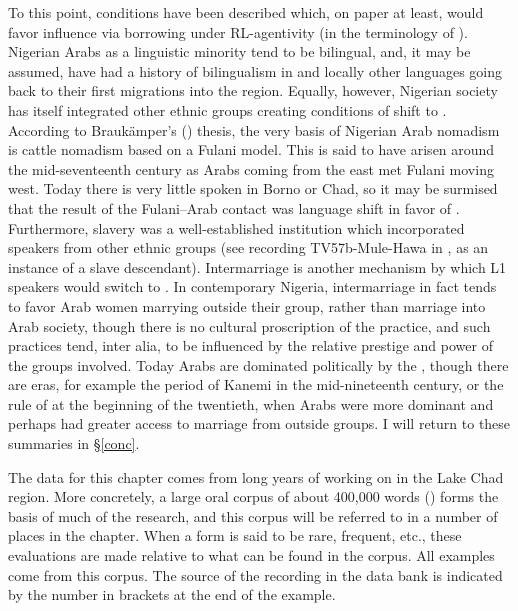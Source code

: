 \documentclass[output=paper]{langsci/langscibook}
\begin{document}
To this point, conditions have been described which, on paper at least, would favor influence via borrowing under RL-agentivity (in the terminology of \citealt{VanCoetsem1988,VanCoetsem2000}). Nigerian Arabs as a linguistic minority tend to be bilingual, and, it may be assumed, have had a history of {bilingualism} in  and locally other languages going back to their first migrations into the region. Equally, however, Nigerian  society has itself integrated other ethnic groups creating conditions of shift to . According to Braukämper’s (\citeyear{Braukämper1994}) thesis, the very basis of Nigerian Arab nomadism is cattle nomadism based on a Fulani model. This is said to have arisen around the mid-seventeenth century as Arabs coming from the east met Fulani moving west. Today there is very little  spoken in {Borno} or Chad, so it may be surmised that the result of the Fulani--Arab contact was {language shift} in favor of . Furthermore, slavery was a well-established institution which incorporated speakers from other ethnic groups (see recording TV57b-Mule-Hawa in \citealt{OwensHassan2011}, as an instance of a slave descendant). Intermarriage is another mechanism by which L1 speakers would switch to . In contemporary Nigeria, intermarriage in fact tends to favor Arab women marrying outside their group, rather than marriage into Arab society, though there is no cultural proscription of the practice, and such practices tend, inter alia, to be influenced by the {relative} {prestige} and power of the groups involved. Today Arabs are dominated politically by the , though there are eras, for example the period of Kanemi in the mid-nineteenth century, or the rule of  at the beginning of the twentieth, when Arabs were more dominant and perhaps had greater access to marriage from outside groups. I will return to these summaries in §\ref{conc}.

The data for this chapter comes from long years of working on  in the {Lake Chad} region. More concretely, a large oral corpus of about 400,000 words (\citealt{OwensHassan2011}) forms the basis of much of the research, and this corpus will be referred to in a number of places in the chapter. When a form is said to be rare, frequent, etc., these evaluations are made {relative} to what can be found in the corpus. All examples come from this corpus. The source of the recording in the data bank is indicated by the number in brackets at the end of the example.
\end{document}
